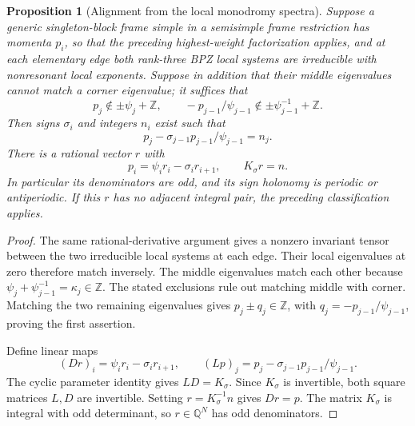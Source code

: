\documentclass[11pt,a4paper]{article}
\numberwithin{equation}{section}
\newtheorem{proposition}[theorem]{Proposition}
\theoremstyle{definition}\newtheorem{definition}[theorem]{Definition}
\theoremstyle{remark}\newtheorem{remark}[theorem]{Remark}
\begin{document}
\begin{proposition}[Alignment from the local monodromy spectra]
\label{g:prop:monodromy-alignment}
Suppose a generic singleton-block frame simple in a semisimple frame
restriction has momenta $p_i$, so that the preceding highest-weight
factorization applies, and at each elementary edge both rank-three BPZ local systems
are irreducible with nonresonant local exponents. Suppose in addition
that their middle eigenvalues cannot match a corner eigenvalue;
it suffices that
\[
 p_j\notin\pm\psi_j+\mathbb Z,\qquad
 -p_{j-1}/\psi_{j-1}
                \notin\pm\psi_{j-1}^{-1}+\mathbb Z.
\]
Then signs $\sigma_i$ and integers $n_i$ exist such that
\[
 p_j-\sigma_{j-1}p_{j-1}/\psi_{j-1}=n_j.
\]
There is a rational vector $r$ with
\[
 p_i=\psi_i r_i-\sigma_i r_{i+1},\qquad K_\sigma r=n.
\]
In particular its denominators are odd, and its sign holonomy is
periodic or antiperiodic. If this $r$ has no adjacent integral pair,
the preceding classification applies.
\end{proposition}
\begin{proof}
The same rational-derivative argument gives a nonzero invariant
tensor between the two irreducible local systems at each edge.
Their local eigenvalues at zero therefore match inversely.
The middle eigenvalues match each other because
$\psi_j+\psi_{j-1}^{-1}=\kappa_j\in\mathbb Z$.
The stated exclusions rule out matching middle with corner.
Matching the two remaining eigenvalues gives
$p_j\pm q_j\in\mathbb Z$, with
$q_j=-p_{j-1}/\psi_{j-1}$, proving the first assertion.

Define linear maps
\[
 (Dr)_i=\psi_i r_i-\sigma_i r_{i+1},\qquad
 (Lp)_j=p_j-\sigma_{j-1}p_{j-1}/\psi_{j-1}.
\]
The cyclic parameter identity gives $LD=K_\sigma$.
Since $K_\sigma$ is invertible, both square matrices $L,D$ are
invertible. Setting $r=K_\sigma^{-1}n$ gives $Dr=p$.
The matrix $K_\sigma$ is integral with odd determinant, so
$r\in\mathbb Q^N$ has odd denominators.
\end{proof}
\end{document}
